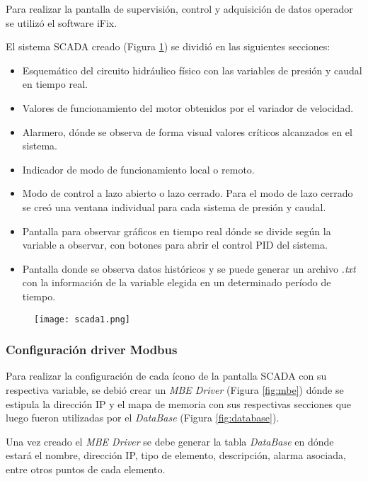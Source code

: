 
Para realizar la pantalla de supervisión, control y adquisición de datos operador se utilizó el software iFix.

El sistema SCADA creado (Figura \ref{fig:scada1}) se dividió en las siguientes secciones:
\begin{itemize}
	\item Esquemático del circuito hidráulico físico con las variables de presión y caudal en tiempo real.
	\item Valores de funcionamiento del motor obtenidos por el variador de velocidad.
	\item Alarmero, dónde se observa de forma visual valores críticos alcanzados en el sistema.
	\item Indicador de modo de funcionamiento local o remoto.
	\item Modo de control a lazo abierto o lazo cerrado.
	\subitem Para el modo de lazo cerrado se creó una ventana individual para cada sistema de presión y caudal.
	\item Pantalla para observar gráficos en tiempo real dónde se divide según la variable a observar, con botones para abrir el control PID del sistema.
	\item Pantalla donde se observa datos históricos y se puede generar un archivo \textit{.txt} con la información de la variable elegida en un determinado período de tiempo.
\end{itemize} 

\begin{figure}[h!]
	\centering
	\texttt{[image: scada1.png]}
	\label{fig:scada1}
\end{figure}

\clearpage
\subsubsection{Configuración driver Modbus}
Para realizar la configuración de cada ícono de la pantalla SCADA con su respectiva variable, se debió crear un \textit{MBE Driver} (Figura \ref{fig:mbe}) dónde se estipula la dirección IP y el mapa de memoria con sus respectivas secciones que luego fueron utilizadas por el \textit{DataBase} (Figura \ref{fig:database}). 

Una vez creado el \textit{MBE Driver} se debe generar la tabla \textit{DataBase} en dónde estará el nombre, dirección IP, tipo de elemento, descripción, alarma asociada, entre otros puntos de cada elemento.

